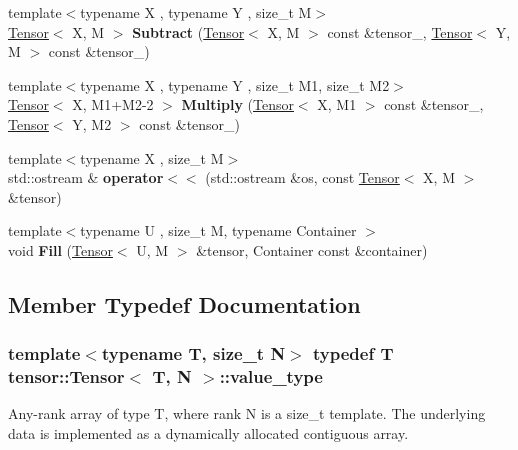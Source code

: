 \begin{DoxyCompactItemize}
\item 
{\footnotesize template$<$typename X , typename Y , size\+\_\+t M$>$ }\\\hyperlink{classtensor_1_1Tensor}{Tensor}$<$ X, M $>$ {\bfseries Subtract} (\hyperlink{classtensor_1_1Tensor}{Tensor}$<$ X, M $>$ const \&tensor\+\_, \hyperlink{classtensor_1_1Tensor}{Tensor}$<$ Y, M $>$ const \&tensor\+\_)\hypertarget{classtensor_1_1Tensor_aa9f4e32f5d75227d8a6e75ae813a1830}{}\label{classtensor_1_1Tensor_aa9f4e32f5d75227d8a6e75ae813a1830}

\item 
{\footnotesize template$<$typename X , typename Y , size\+\_\+t M1, size\+\_\+t M2$>$ }\\\hyperlink{classtensor_1_1Tensor}{Tensor}$<$ X, M1+M2-\/2 $>$ {\bfseries Multiply} (\hyperlink{classtensor_1_1Tensor}{Tensor}$<$ X, M1 $>$ const \&tensor\+\_, \hyperlink{classtensor_1_1Tensor}{Tensor}$<$ Y, M2 $>$ const \&tensor\+\_)\hypertarget{classtensor_1_1Tensor_a444e6496f2d094a932c9df8bd2b6b845}{}\label{classtensor_1_1Tensor_a444e6496f2d094a932c9df8bd2b6b845}

\item 
{\footnotesize template$<$typename X , size\+\_\+t M$>$ }\\std\+::ostream \& {\bfseries operator$<$$<$} (std\+::ostream \&os, const \hyperlink{classtensor_1_1Tensor}{Tensor}$<$ X, M $>$ \&tensor)\hypertarget{classtensor_1_1Tensor_a604769864add641c2cb711a392fb919b}{}\label{classtensor_1_1Tensor_a604769864add641c2cb711a392fb919b}

\item 
{\footnotesize template$<$typename U , size\+\_\+t M, typename Container $>$ }\\void {\bfseries Fill} (\hyperlink{classtensor_1_1Tensor}{Tensor}$<$ U, M $>$ \&tensor, Container const \&container)\hypertarget{classtensor_1_1Tensor_a4ca1c6ec88d6541c1445bfe953582a23}{}\label{classtensor_1_1Tensor_a4ca1c6ec88d6541c1445bfe953582a23}

\end{DoxyCompactItemize}


\subsection{Member Typedef Documentation}
\subsubsection[{\texorpdfstring{value\+\_\+type}{value_type}}]{\setlength{\rightskip}{0pt plus 5cm}template$<$typename T, size\+\_\+t N$>$ typedef T {\bf tensor\+::\+Tensor}$<$ T, N $>$\+::{\bf value\+\_\+type}}\hypertarget{classtensor_1_1Tensor_ad2bb23b5363bc4cdb97c43b48abb80f9}{}\label{classtensor_1_1Tensor_ad2bb23b5363bc4cdb97c43b48abb80f9}
Any-\/rank array of type {\ttfamily T}, where rank {\ttfamily N} is a size\+\_\+t template. The underlying data is implemented as a dynamically allocated contiguous array. 

